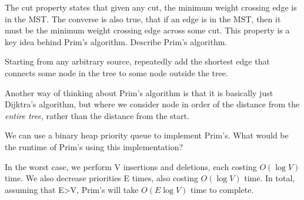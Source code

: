 \begin{blocksection}
The cut property states that given any cut, the minimum weight crossing edge is in the MST. The converse is also true, that if an edge is in the MST, then it must be the minimum weight crossing edge across some cut. This property is a key idea behind Prim's algorithm.
\question Describe Prim's algorithm.

\begin{solution}[0.5in]
Starting from any arbitrary source, repeatedly add the shortest edge that
connects some node in the tree to some node outside the tree.

Another way of thinking about Prim's algorithm is that it is basically just
Dijktra's algorithm, but where we consider node in order of the distance from the
\emph{entire tree}, rather than the distance from the start.
\end{solution}

\question We can use a binary heap priority queue to implement Prim's. What would be the runtime of Prim's using this implementation?  
\begin{solution}[0.75in]
In the worst case, we perform V insertions and deletions, each costing $O(\log V)$ time. We also decrease priorities E times, also costing $O(\log V)$ time. In total, assuming that E\textgreater  V, Prim's will take $O(E \log V)$ time to complete.

\end{solution}
\end{blocksection}
